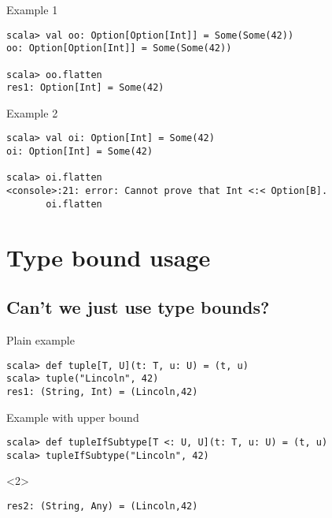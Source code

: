 \documentclass[11pt]{beamer}
\begin{document}
\begin{frame}[fragile]

\begin{block}{Example 1} 
\begin{lstlisting} 
scala> val oo: Option[Option[Int]] = Some(Some(42))
oo: Option[Option[Int]] = Some(Some(42))

scala> oo.flatten
res1: Option[Int] = Some(42)
\end{lstlisting} 
\end{block}

\begin{block}{Example 2}
\begin{lstlisting} 
scala> val oi: Option[Int] = Some(42)
oi: Option[Int] = Some(42)

scala> oi.flatten
<console>:21: error: Cannot prove that Int <:< Option[B].
       oi.flatten
\end{lstlisting} 
\end{block} 
\end{frame}


\section{Type bound usage} 
\subsection{Can’t we just use type bounds?}
\begin{frame}[fragile] {Plain example}
\begin{lstlisting} 
scala> def tuple[T, U](t: T, u: U) = (t, u)
scala> tuple("Lincoln", 42)
res1: (String, Int) = (Lincoln,42)
\end{lstlisting}
\end{frame}

\begin{frame}[fragile] {Example with upper bound}
\begin{lstlisting} 
scala> def tupleIfSubtype[T <: U, U](t: T, u: U) = (t, u)
scala> tupleIfSubtype("Lincoln", 42)
\end{lstlisting} 
\begin{uncoverenv}<2> 
\begin{lstlisting} 
res2: (String, Any) = (Lincoln,42)
\end{lstlisting} 
\end{uncoverenv}
\end{frame}
\end{document}
